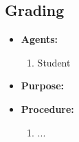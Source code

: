 \subsection{Grading}


\begin{itemize}
  \item \textbf{Agents:} \begin{enumerate}
    \item Student
  \end{enumerate}
  \item \textbf{Purpose:}
  \item \textbf{Procedure:}
  \begin{enumerate}
    \item ...
  \end{enumerate}
\end{itemize}
